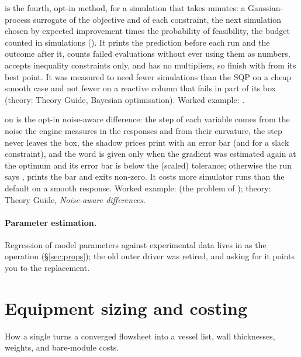 \documentclass[11pt,a4paper]{article}
\begin{document}
 is the fourth, opt-in method, for a simulation that takes minutes: a
Gaussian-process surrogate of the objective and of each constraint, the next simulation chosen by
expected improvement times the probability of feasibility, the budget counted in simulations
().  It prints the prediction before each run and
the outcome after it, counts failed evaluations without ever using them as numbers, accepts
inequality constraints only, and has no multipliers, so finish with  from its best
point.  It was measured to need fewer simulations than the SQP on a cheap smooth case and not fewer
on a reactive column that fails in part of its box (theory: Theory Guide, Bayesian optimisation).
Worked example: .

 on  is the opt-in noise-aware difference: the step of each
variable comes from the noise the engine measures in the responses and from their curvature,
the step never leaves the box, the shadow prices print with an error bar (and 
for a slack constraint), and the word  is given only when the gradient was
estimated again at the optimum and its error bar is below the (scaled) tolerance; otherwise the
run says , prints the bar and exits non-zero.  It costs more
simulator runs than the default on a smooth response.  Worked example:
 (the problem of ); theory: Theory
Guide, \emph{Noise-aware differences}.

\paragraph{Parameter estimation.}  Regression of model parameters
against experimental data lives in  as the
 operation (\S\ref{sec:props}); the old
 outer driver was retired, and asking for it points
you to the replacement.

\section{Equipment sizing and costing}\label{sec:post}

\begin{whatyoulllearn}
How a single  turns a converged flowsheet into a vessel
list, wall thicknesses, weights, and bare-module costs.
\end{whatyoulllearn}
\end{document}
